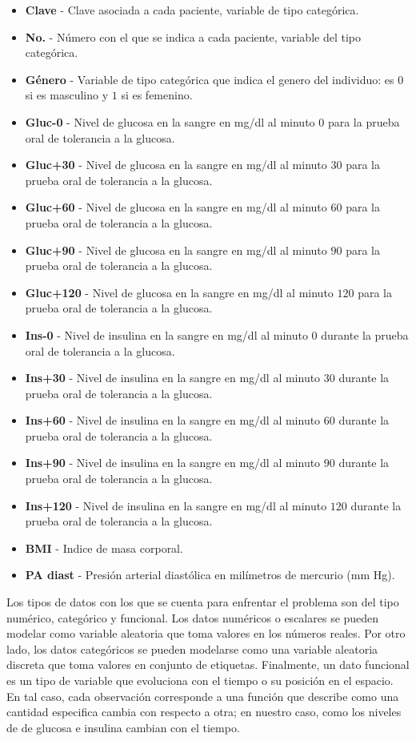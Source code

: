 \begin{itemize}
    \item \textbf{Clave} - Clave asociada a cada paciente, variable de tipo categórica.
    \item \textbf{No.} - Número con el que se indica a cada paciente, variable del tipo categórica.
    \item \textbf{Género} - Variable de tipo categórica que indica el genero del individuo: es $0$ si es masculino y $1$ si es femenino.
    \item \textbf{Gluc-0} - Nivel de glucosa en la sangre en mg/dl al minuto $0$ para la prueba oral de tolerancia a la glucosa.
    \item \textbf{Gluc+30} - Nivel de glucosa en la sangre en mg/dl al minuto $30$ para la prueba oral de tolerancia a la glucosa.
    \item \textbf{Gluc+60} - Nivel de glucosa en la sangre en mg/dl al minuto $60$ para la prueba oral de tolerancia a la glucosa.
    \item \textbf{Gluc+90} - Nivel de glucosa en la sangre en mg/dl al minuto $90$ para la prueba oral de tolerancia a la glucosa.
    \item \textbf{Gluc+120} - Nivel de glucosa en la sangre en mg/dl al minuto $120$ para la prueba oral de tolerancia a la glucosa.
    \item \textbf{Ins-0} - Nivel de insulina en la sangre en mg/dl al minuto $0$ durante la prueba oral de tolerancia a la glucosa.
    \item \textbf{Ins+30} - Nivel de insulina en la sangre en mg/dl al minuto $30$ durante la prueba oral de tolerancia a la glucosa.
    \item \textbf{Ins+60} - Nivel de insulina en la sangre en mg/dl al minuto $60$ durante la prueba oral de tolerancia a la glucosa.
    \item \textbf{Ins+90} - Nivel de insulina en la sangre en mg/dl al minuto $90$ durante la prueba oral de tolerancia a la glucosa.
    \item \textbf{Ins+120} - Nivel de insulina en la sangre en mg/dl al minuto $120$ durante la prueba oral de tolerancia a la glucosa.
    \item \textbf{BMI} - Indice de masa corporal.
    \item \textbf{PA diast} - Presión arterial diastólica en milímetros de mercurio (mm Hg).
\end{itemize}

Los tipos de datos con los que se cuenta para enfrentar el problema son del tipo numérico, categórico y funcional. Los datos numéricos o escalares se pueden modelar como variable aleatoria que toma valores en los números reales. Por otro lado, los datos categóricos se pueden modelarse como una variable aleatoria discreta que toma valores en conjunto de  etiquetas. Finalmente, un dato funcional es un tipo de variable que evoluciona con el tiempo o su posición en el espacio. En tal caso, cada observación corresponde a una función que describe como una cantidad especifica cambia con respecto a otra; en nuestro caso, como los niveles de de glucosa e insulina cambian con el tiempo.

